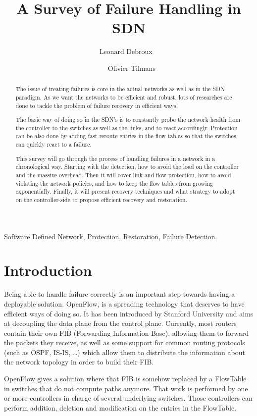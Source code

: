 \documentclass[]{IEEEtran}
\author{Leonard Debroux ~\and~ Olivier Tilmans\\
\IEEEauthorblockA{
  EPL, UCL\\
  Louvain-la-Neuve, Belgium\\
  \{leonard.debroux, olivier.tilmans\}@student.uclouvain.be
}}
\title{A Survey of Failure Handling in SDN}
\begin{document}
\maketitle
\begin{abstract}
The issue of treating failures is core in the actual networks as well as in the SDN paradigm. As we want the networks to be efficient and robust, lots of researches are done to tackle the problem of failure recovery in efficient ways.

The basic way of doing so in the SDN's is to constantly probe the network health from the controller to the switches as well as the links, and to react accordingly. Protection can be also done by adding fast reroute entries in the flow tables so that the switches can quickly react to a failure.

This survey will go through the process of handling failures in a network in a chronological way. Starting with the detection, how to avoid the load on the controller and the massive overhead. Then it will cover link and flow protection, how to avoid violating the network policies, and how to keep the flow tables from growing exponentially. Finally, it will present recovery techniques and what strategy to adopt on the controller-side to propose efficient recovery and restoration.
\end{abstract}

\begin{IEEEkeywords}
Software Defined Network, Protection, Restoration, Failure Detection.
\end{IEEEkeywords}

\section{Introduction}
Being able to handle failure correctly is an important step towards having a deployable solution. OpenFlow, is a spreading technology that deserves to have efficient ways of doing so. It has been introduced by Stanford University and aims at decoupling the data plane from the control plane. Currently, most routers contain their own FIB (Forwarding Information Base), allowing them to forward the packets they receive, as well as some support for common routing protocols (such as OSPF, IS-IS, \ldots) which allow them to distribute the information about the network topology in order to build their FIB.

OpenFlow gives a solution where that FIB is somehow replaced by a FlowTable in switches that do not compute paths anymore. That work is performed by one or more controllers in charge of several underlying switches. Those controllers can perform addition, deletion and modification on the entries in the FlowTable.
\end{document}
